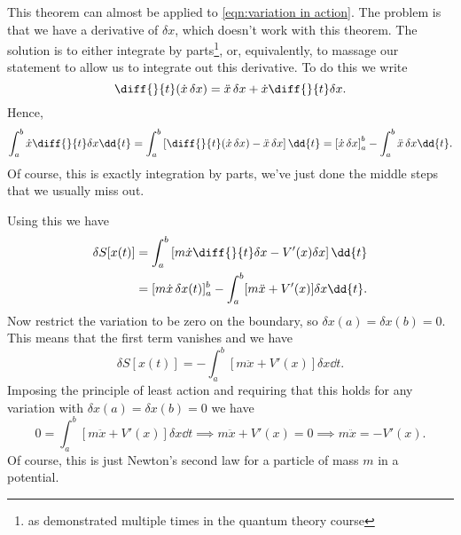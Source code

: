 This theorem can almost be applied to \cref{eqn:variation in action}.
The problem is that we have a derivative of \(\delta x\), which doesn't work with this theorem.
The solution is to either integrate by parts\footnote{as demonstrated multiple times in the quantum theory course}, or, equivalently, to massage our statement to allow us to integrate out this derivative.
To do this we write
\begin{equation}
    \diff{}{t} (\dot{x} \, \delta x) = \ddot{x} \, \delta x + \dot{x} \diff{}{t}\delta x.
\end{equation}
Hence,
\begin{equation}
    \int_a^b \dot{x}\diff{}{t}\delta x \dd{t} = \int_a^b \left[ \diff{}{t}(\dot{x} \, \delta x) - \ddot{x} \, \delta x \right] \dd{t} = \left[ \dot{x} \, \delta x \right]_a^b - \int_a^b \ddot{x} \, \delta x \dd{t}.
\end{equation}
Of course, this is exactly integration by parts, we've just done the middle steps that we usually miss out.

Using this we have
\begin{align}
    \delta S[x(t)] &= \int_a^b \left[ m\dot{x} \diff{}{t}\delta x - V'(x)\delta x \right]\dd{t}\\
    &= [m\dot{x} \, \delta x(t)]_a^b - \int_a^b [m\ddot{x} + V'(x)]\delta x \dd{t}.
\end{align}
Now restrict the variation to be zero on the boundary, so \(\delta x(a) = \delta x(b) = 0\).
This means that the first term vanishes and we have
\begin{equation}
    \delta S[x(t)] = -\int_a^b [m \ddot{x} + V'(x)] \delta x \dd{t}.
\end{equation}
Imposing the principle of least action and requiring that this holds for any variation with \(\delta x(a) = \delta x(b) = 0\) we have
\begin{equation}
    0 = \int_a^b [m\ddot{x} + V'(x)] \delta x \dd{t} \implies m\ddot{x} + V'(x) = 0 \implies m\ddot{x} = -V'(x).
\end{equation}
Of course, this is just Newton's second law for a particle of mass \(m\) in a potential.

